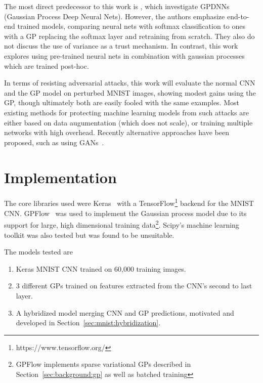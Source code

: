 \documentclass{article}
\begin{document}
The most direct predecessor to this work is \citet{Bradshaw2017}, which investigate GPDNNs (Gaussian Process Deep Neural Nets). However, the authors emphasize end-to-end trained models, comparing neural nets with softmax classification to ones with a GP replacing the softmax layer and retraining from scratch. They also do not discuss the use of variance as a trust mechanism. In contrast, this work explores using pre-trained neural nets in combination with gaussian processes which are trained post-hoc. 

In terms of resisting adversarial attacks, this work will evaluate the normal CNN and the GP model on perturbed MNIST images, showing modest gains using the GP, though ultimately both are easily fooled with the same examples. Most existing methods for protecting machine learning models from such attacks are either based on data augumentation (which does not scale), or training multiple networks with high overhead. Recently alternative approaches have been proposed, such as using GANs~\cite{samangouei2018defense}\cite{zantedeschi2017efficient}.


 
\section{Implementation}


The core libraries used were Keras~\cite{chollet2015keras} with a TensorFlow\footnote{https://www.tensorflow.org/} backend for the MNIST CNN. GPFlow~\cite{GPflow2017} was used to implement the Gaussian process model due to its support for large, high dimensional training data\footnote{GPFlow implements sparse variational GPs described in Section~\ref{sec:background:gp} as well as batched training}. Scipy's machine learning toolkit was also tested but was found to be unsuitable.

The models tested are
\begin{enumerate}
\item Keras MNIST CNN trained on 60,000 training images.
\item 3 different GPs trained on features extracted from the CNN's second to last layer.
\item A hybridized model merging CNN and GP predictions, motivated and developed in Section~\ref{sec:mnist:hybridization}.
\end{enumerate} 
\end{document}
